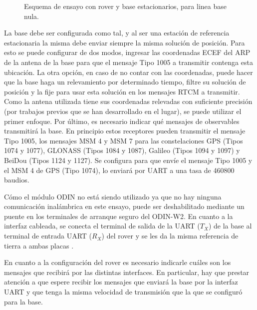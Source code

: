 \documentclass[a4paper,12pt,oneside,onecolumn,final,openright]{book}%
\begin{document}
\begin{figure}
\centering
{}
\centering
{}
\caption{Esquema de ensayo con rover y base estacionarios, para linea base nula.}
\label{fig:EnsayoZBL}
\end{figure}

	La base debe ser configurada como tal, y al ser una estación de referencia estacionaria la misma debe enviar siempre la misma solución de posición. Para esto se puede configurar de dos modos, ingresar las coordenadas ECEF del ARP de la antena de la base para que el mensaje Tipo 1005 a transmitir contenga esta ubicación. La otra opción, en caso de no contar con las coordenadas, puede hacer que la base haga un relevamiento por determinado tiempo, filtre su solución de posición y la fije para usar esta solución en los mensajes RTCM a transmitir. Como la antena utilizada tiene sus coordenadas relevadas con suficiente precisión (por trabajos previos que se han desarrollado en el lugar), se puede utilizar el primer enfoque. Por último, es necesario indicar qué mensajes de observables transmitirá la base. En principio estos receptores pueden transmitir el mensaje Tipo 1005, los mensajes MSM 4 y MSM 7 para las constelaciones GPS (Tipos 1074 y 1077), GLONASS (Tipos 1084 y 1087), Galileo (Tipos 1094 y 1097) y BeiDou (Tipos 1124 y 1127). Se configura para que envíe el mensaje Tipo 1005 y el MSM 4 de GPS (Tipo 1074), lo enviará por UART a una tasa de 460800 baudios.
	
	Cómo el módulo ODIN no está siendo utilizado ya que no hay ninguna comunicación inalámbrica en este ensayo, puede ser deshabilitado mediante un puente en los terminales de arranque seguro del ODIN-W2. En cuanto a la interfaz cableada, se conecta el terminal de salida de la UART ($T_X$) de la base al terminal de entrada UART ($R_X$) del rover y se les da la misma referencia de tierra a ambas placas \cite{moving_base_AppN}.
	
	En cuanto a la configuración del rover es necesario indicarle cuáles son los mensajes que recibirá por las distintas interfaces. En particular, hay que prestar atención a que espere recibir los mensajes que enviará la base por la interfaz UART y que tenga la misma velocidad de transmisión que la que se configuró para la base.
\end{document}
